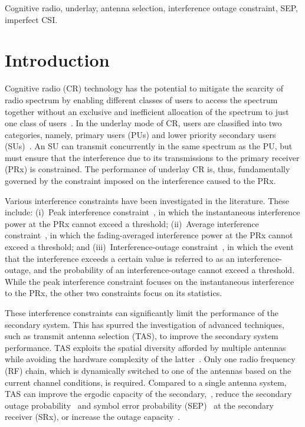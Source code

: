\documentclass[journal]{IEEEtran}
\begin{document}
\begin{IEEEkeywords}
Cognitive radio, underlay, antenna selection, interference outage constraint, SEP, imperfect CSI.
\end{IEEEkeywords}

\IEEEpeerreviewmaketitle



\section{Introduction}	
\label{sec:intro}

Cognitive radio (CR) technology has the potential to mitigate the scarcity of radio spectrum by enabling different classes of users to access the spectrum together without an exclusive and inefficient allocation of the spectrum to just one class of users~\cite{Goldsmith_2009_PIEEE}. In the underlay mode of CR, users are classified into two categories, namely,   primary users (PUs) and lower priority secondary users (SUs)~\cite{Goldsmith_2009_PIEEE}. An SU can transmit concurrently in the same spectrum as the PU, but must ensure that the interference due to its transmissions to the primary receiver (PRx) is constrained. The performance of underlay CR is, thus, fundamentally governed by the constraint imposed on the interference caused to the PRx. 

Various interference constraints have been investigated in the literature. These include: (i)~Peak interference constraint~\cite{Fakhan_2014_TSP,Hanif_2015_globecom,Wang_2010_TWC,RZhang_2009_TWC,Suraweera_2010_TVT,li_2011_pimrc}, in which  the instantaneous interference power at the PRx cannot exceed  a threshold; (ii)~Average interference constraint~\cite{ Sarvendranath_2013_TCOM,Sarvendranath_2014_TCOM,Wang_2011_TCom}, in which  the fading-averaged interference power at the PRx  cannot exceed  a threshold;  and (iii)~Interference-outage constraint~\cite{Kashyap_2014_TCOM,Sboui_2013_TWC}, in which the event that the interference exceeds a certain value is referred to as an interference-outage, and the probability of an interference-outage cannot exceed a threshold. While the peak interference constraint focuses on the instantaneous interference to the PRx, the other two constraints focus on its statistics. 



These interference constraints can significantly limit the performance of the secondary system. This has spurred the investigation of advanced techniques, such as transmit antenna selection (TAS), to improve the secondary system performance. TAS exploits the spatial diversity afforded by multiple antennas while avoiding the hardware complexity of the latter~\cite{mehta_2012_ComMag}. Only one radio frequency (RF) chain, which is dynamically switched to one of the antennas based on the current channel conditions, is required. 
Compared to a single antenna system, TAS can improve the ergodic capacity of the secondary,~\cite{Hanif_2015_globecom,Wang_2010_TWC}, reduce the secondary outage probability~\cite{Hanif_2015_globecom,Kong_2011_JCN} and symbol error probability (SEP)~\cite{Sarvendranath_2013_TCOM,Sarvendranath_2014_TCOM} at the secondary receiver (SRx), or increase the outage capacity~\cite{Kong_2011_JCN}.
\end{document}
